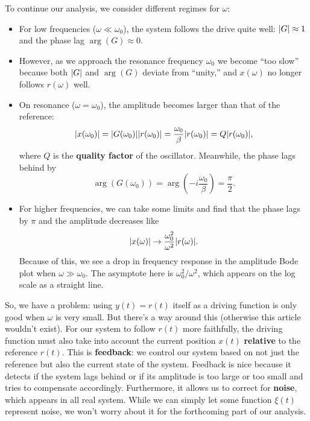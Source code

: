 \documentclass{article}
\theoremstyle{definition}
\newcommand{\f}[2]{\frac{#1}{#2}}
\newcommand{\lp}{\left(}
\newcommand{\rp}{\right)}
\begin{document}
\noindent To continue our analysis, we consider different regimes for $\omega$:
\begin{itemize}
	\item  For low frequencies ($\omega \ll \omega_0$), the system follows the drive quite well: $\abs{G} \approx 1$ and the phase lag $\arg(G) \approx 0$.
	
	\item However, as we approach the resonance frequency $\omega_0$ we become ``too slow'' because both $\abs{G}$ and $\arg(G)$ deviate from ``unity,'' and $x(\omega)$ no longer follows $r(\omega)$ well.
	
	
	\item  On resonance ($\omega = \omega_0$), the amplitude becomes larger than that of the reference: 
	\begin{equation*}
	\abs{x(\omega_0)} = \abs{G(\omega_0)}\abs{r(\omega_0)} = \f{\omega_0}{\beta} \abs{r(\omega_0)} = Q\abs{r(\omega_0)}, 
	\end{equation*}
	where $Q$ is the \textbf{quality factor} of the oscillator. Meanwhile, the phase lags behind by 
	\begin{equation*}
	\arg(G(\omega_0)) = \arg\lp -i\f{\omega_0}{\beta} \rp = \f{\pi}{2}.
	\end{equation*}
	
	
	\item For higher frequencies, we can take some limits and find that the phase lags by $\pi$ and the amplitude decreases like 
	\begin{equation*}
	\abs{x(\omega)} \to \f{\omega_0^2}{\omega^2}\abs{r(\omega)}.
	\end{equation*}
	Because of this, we see a drop in frequency response in the amplitude Bode plot when $\omega \gg \omega_0$. The asymptote here is $\omega_0^2/\omega^2$, which appears on the log scale as a straight line. 
\end{itemize}




So, we have a problem: using $y(t) = r(t)$ itself as a driving function is only good when $\omega$ is very small. But there's a way around this (otherwise this article wouldn't exist). For our system to follow $r(t)$ more faithfully, the driving function must also take into account the current position $x(t)$ \textbf{relative} to the reference $r(t)$. This is \textbf{feedback}: we control our system based on not just the reference but also the current state of the system. Feedback is nice because it detects if the system lags behind or if its amplitude is too large or too small and tries to compensate accordingly. Furthermore, it allows us to correct for \textbf{noise}, which appears in all real system. While we can simply let some function $\xi(t)$ represent noise, we won't worry about it for the forthcoming part of our analysis. \\
\end{document}
